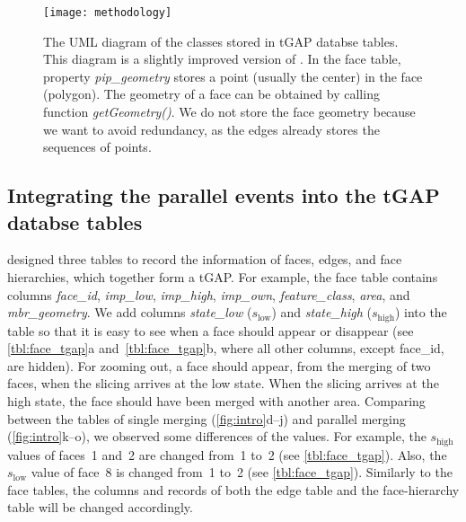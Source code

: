 \documentclass[]{interact}
\begin{document}
\begin{figure}[tb]
\centering
\texttt{[image: methodology]}
\caption{The UML diagram of the classes stored in tGAP databse tables.
This diagram is a slightly improved version of \citet[]{Meijers2011Thesis}.
In the face table, property \emph{pip\_geometry} 
stores a point (usually the center) in the face (polygon).
The geometry of a face can be obtained by calling function \emph{getGeometry()}.
We do not store the face geometry because we want to avoid redundancy,
as the edges already stores the sequences of points.
}
\label{fig:uml_tgap}
\end{figure}


\subsection{Integrating the parallel events into the tGAP databse tables}
\label{sec:integrate_tgap}

\citet[]{Meijers2011Thesis} designed three tables 
to record the information of
faces, edges, and face hierarchies, 
which together form a tGAP.
For example, the face table contains columns \emph{face\_id}, 
\emph{imp\_low}, \emph{imp\_high}, \emph{imp\_own},
\emph{feature\_class}, \emph{area}, and \emph{mbr\_geometry}.
We add columns \emph{state\_low} ($s_\mathrm{low}$) 
and \emph{state\_high} ($s_\mathrm{high}$) into the table 
so that it is easy to see when a face should appear or disappear 
(see \tabls\ref{tbl:face_tgap}a and~\ref{tbl:face_tgap}b,
where all other columns, except face\_id, are hidden).
For zooming out, a face should appear, 
from the merging of two faces,
when the slicing arrives at the low state.
When the slicing arrives at the high state,
the face should have been merged with another area.
Comparing between the tables of single merging 
(\figs\ref{fig:intro}d--j)
and parallel merging (\figs\ref{fig:intro}k--o),
we observed some differences of the values.
For example, the $s_\mathrm{high}$ values of faces~1 and~2 are changed from~1 to~2
(see \tabl\ref{tbl:face_tgap}).
Also, the $s_\mathrm{low}$ value of face~8 is changed from~1 to~2
(see \tabl\ref{tbl:face_tgap}).
Similarly to the face tables, 
the columns and records of both the edge table and the face-hierarchy table 
will be changed accordingly.
\end{document}
